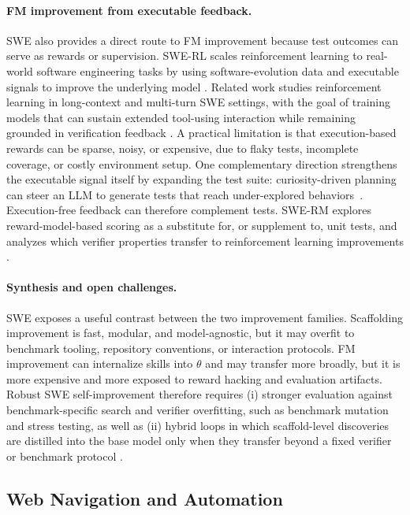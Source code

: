 \paragraph{FM improvement from executable feedback.}
SWE also provides a direct route to FM improvement because test outcomes can serve as rewards or supervision. SWE-RL scales reinforcement learning to real-world software engineering tasks by using software-evolution data and executable signals to improve the underlying model \citep{wei2025swerladvancingllmreasoning}. Related work studies reinforcement learning in long-context and multi-turn SWE settings, with the goal of training models that can sustain extended tool-using interaction while remaining grounded in verification feedback \citep{golubev2025traininglongcontextmultiturnsoftware}. A practical limitation is that execution-based rewards can be sparse, noisy, or expensive, due to flaky tests, incomplete coverage, or costly environment setup. One complementary direction strengthens the executable signal itself by expanding the test suite: curiosity-driven planning can steer an LLM to generate tests that reach under-explored behaviors~\citep{amayuelas2026planning}. Execution-free feedback can therefore complement tests. SWE-RM explores reward-model-based scoring as a substitute for, or supplement to, unit tests, and analyzes which verifier properties transfer to reinforcement learning improvements \citep{shum2025swermexecutionfreefeedbacksoftware}.

\paragraph{Synthesis and open challenges.}
SWE exposes a useful contrast between the two improvement families. Scaffolding improvement is fast, modular, and model-agnostic, but it may overfit to benchmark tooling, repository conventions, or interaction protocols. FM improvement can internalize skills into $\theta$ and may transfer more broadly, but it is more expensive and more exposed to reward hacking and evaluation artifacts. Robust SWE self-improvement therefore requires (i) stronger evaluation against benchmark-specific search and verifier overfitting, such as benchmark mutation and stress testing, as well as (ii) hybrid loops in which scaffold-level discoveries are distilled into the base model only when they transfer beyond a fixed verifier or benchmark protocol \citep{garg2026savingswebenchbenchmarkmutation}.

\subsection{Web Navigation and Automation}

